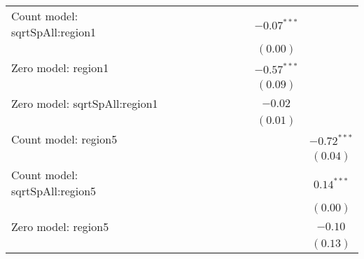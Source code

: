 \begin{table}
\begin{center}
{\begin{tabular}{l c c c c c c c c c}
Count model: sqrtSpAll:region1 &                &                &               &               &               &                 &               & $-0.07^{***}$ &                 \\
                               &                &                &               &               &               &                 &               & $(0.00)$      &                 \\
Zero model: region1            &                &                &               &               &               &                 &               & $-0.57^{***}$ &                 \\
                               &                &                &               &               &               &                 &               & $(0.09)$      &                 \\
Zero model: sqrtSpAll:region1  &                &                &               &               &               &                 &               & $-0.02$       &                 \\
                               &                &                &               &               &               &                 &               & $(0.01)$      &                 \\
Count model: region5           &                &                &               &               &               &                 &               &               & $-0.72^{***}$   \\
                               &                &                &               &               &               &                 &               &               & $(0.04)$        \\
Count model: sqrtSpAll:region5 &                &                &               &               &               &                 &               &               & $0.14^{***}$    \\
                               &                &                &               &               &               &                 &               &               & $(0.00)$        \\
Zero model: region5            &                &                &               &               &               &                 &               &               & $-0.10$         \\
                               &                &                &               &               &               &                 &               &               & $(0.13)$        \\

\end{tabular}}
\end{center}
\end{table}
